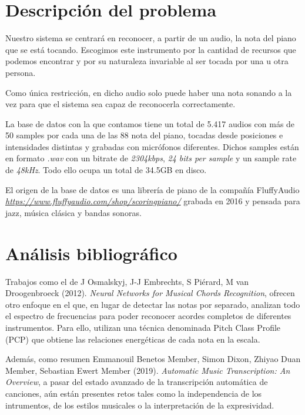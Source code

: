 \documentclass[12pt]{article}
\begin{document}
\newpage

\section{Descripción del problema}
\label{Descripción del problema}

Nuestro sistema se centrará en reconocer, a partir de un audio, la nota del piano que se está tocando. Escogimos este instrumento por la cantidad de recursos
que podemos encontrar y por su naturaleza invariable al ser tocada por una u otra persona.

\bigskip
Como única restricción, en dicho audio solo puede haber una nota sonando a la vez para que el sistema sea capaz de reconocerla correctamente.

\bigskip
La base de datos con la que contamos tiene un total de 5.417 audios con más de 50 samples por cada una de las 88 nota del piano, tocadas
desde posiciones e intensidades distintas y grabadas con micrófonos diferentes. Dichos samples están en formato \textit{.wav} con un 
bitrate de \textit{2304kbps}, \textit{24 bits per sample} y un sample rate de \textit{48kHz}. Todo ello ocupa un total de 34.5GB en disco.

\bigskip
El origen de la base de datos es una librería de piano de la compañía FluffyAudio \textit{\url{https://www.fluffyaudio.com/shop/scoringpiano/}} 
grabada en 2016 y pensada para jazz, música clásica y bandas sonoras.

\section{Análisis bibliográfico}
\label{Análisis bibliográfico}

Trabajos como el de J Osmalskyj, J-J Embrechts, S Piérard, M van Droogenbroeck (2012). \textit{Neural Networks for Musical Chords Recognition}, ofrecen otro enfoque
en el que, en lugar de detectar las notas por separado, analizan todo el espectro de frecuencias para poder reconocer acordes completos de diferentes instrumentos.
Para ello, utilizan una técnica denominada Pitch Class Profile (PCP) que obtiene las relaciones energéticas de cada nota en la escala.

\bigskip
Además, como resumen Emmanouil Benetos Member, Simon Dixon, Zhiyao Duan Member, Sebastian Ewert Member (2019). \textit{Automatic Music Transcription: An Overview},
a pasar del estado avanzado de la transcripción automática de canciones, aún están presentes retos tales como la independencia de los intrumentos, de los estilos
musicales o la interpretación de la expresividad.
\end{document}

